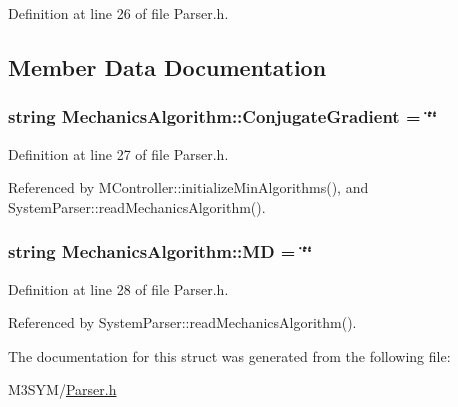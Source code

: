 Definition at line 26 of file Parser.\+h.



\subsection{Member Data Documentation}
\hypertarget{structMechanicsAlgorithm_abd82cd76a29d682076fe9e7d34c5ad4c}{
\subsubsection[{Conjugate\+Gradient}]{\setlength{\rightskip}{0pt plus 5cm}string Mechanics\+Algorithm\+::\+Conjugate\+Gradient = \char`\"{}\char`\"{}}}\label{structMechanicsAlgorithm_abd82cd76a29d682076fe9e7d34c5ad4c}


Definition at line 27 of file Parser.\+h.



Referenced by M\+Controller\+::initialize\+Min\+Algorithms(), and System\+Parser\+::read\+Mechanics\+Algorithm().

\hypertarget{structMechanicsAlgorithm_a50ed844650374782f88fb677c78c4120}{
\subsubsection[{M\+D}]{\setlength{\rightskip}{0pt plus 5cm}string Mechanics\+Algorithm\+::\+M\+D = \char`\"{}\char`\"{}}}\label{structMechanicsAlgorithm_a50ed844650374782f88fb677c78c4120}


Definition at line 28 of file Parser.\+h.



Referenced by System\+Parser\+::read\+Mechanics\+Algorithm().



The documentation for this struct was generated from the following file\+:\begin{DoxyCompactItemize}
\item 
M3\+S\+Y\+M/\hyperlink{Parser_8h}{Parser.\+h}\end{DoxyCompactItemize}

